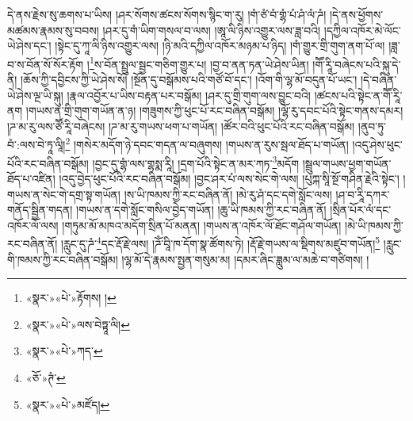 དེ་ནས་རྗེས་སུ་ཆགས་པ་ཡིས། །ཤར་སོགས་ཚངས་སོགས་སྙིང་ག་རུ། །གཾ་ཙཾ་བཾ་གྷཾ་པཾ་ཤཾ་ལཾ་ཌཾ། །དེ་ནས་ཕྱོགས་མཚམས་རྣམས་སུ་བབས། །ཤར་དུ་གཾ་ཡིག་གསལ་བ་ལས། །ཨཱ་ལི་ཉིས་འགྱུར་ལས་ཟླ་བའི། །དཀྱིལ་འཁོར་མེ་ལོང་ཡེ་ཤེས་དང་། །སྟེང་དུ་ཀཱ་ལི་ཉིས་འགྱུར་ལས། །ཉི་མའི་དཀྱིལ་འཁོར་མཉམ་པ་ཉིད། །གཾ་གྱུར་གྲི་གུག་ནག་པོ་ལ། །ཟླ་བ་ས་བོན་སོ་སོར་རྟོག །\footnote{«སྣར་»«པེ་»རྟོགས། །}ས་བོན་སྤྲུལ་སྦྱང་གཅིག་གྱུར་པ། །བྱ་བ་ནན་ཏན་ཡེ་ཤེས་ཡིན། །གཽ་རཱི་བཞེངས་པའི་སྐུ་དེ་ནི། །ཆོས་ཀྱི་དབྱིངས་ཀྱི་ཡེ་ཤེས་སོ། །སྔོན་དུ་བསྒོམས་པའི་གཙོ་བོ་དང་། །འོག་གི་ལྷ་མོ་བདུན་པོ་ཡང་། །དེ་བཞིན་ཡེ་ཤེས་ལྔ་ཡི་སྐུ། །རྣལ་འབྱོར་པ་ཡིས་བརྟན་པར་བསྒོམ། །ཤར་དུ་གྲི་གུག་ལས་བྱུང་བའི། །ཚངས་པའི་སྟེང་ན་གཽ་རཱི་ནག །གཡས་ན་གྲི་གུག་གཡོན་ན་ཉ། །གཟུགས་ཀྱི་ཕུང་པོ་རང་བཞིན་བསྒོམ། །ལྷོ་རུ་དབང་པོའི་སྟེང་གནས་དམར། །ཌ་མ་རུ་ལས་ཙཽ་རཱི་བཞེངས། །ཌ་མ་རུ་གཡས་ཕག་པ་གཡོན། །ཚོར་བའི་ཕུང་པོའི་རང་བཞིན་བསྒོམ། །ནུབ་ཏུ་བཾ་:ལས་བེ་ཏཱ་ལཱི།\footnote{«སྣར་»«པེ་»ལས་བེཏྟཱ་ལི།} །གསེར་མདོག་ཉེ་དབང་གདན་ལ་བཞུགས། །གཡས་ན་རུས་སྦལ་ཐོད་པ་གཡོན། །འདུ་ཤེས་ཕུང་པོའི་རང་བཞིན་བསྒོམ། །བྱང་དུ་གྷཾ་ལས་གྷསྨ་རཱི། །དྲག་པོའི་སྟེང་ན་མར་ཀཏ་\footnote{«སྣར་»«པེ་»ཀད་}མདོག །སྦྲུལ་གཡས་ཕྱག་གཡོན་ཐོད་པ་འཛིན། །འདུ་བྱེད་ཕུང་པོའི་རང་བཞིན་བསྒོམ། །བྱང་ཤར་པཾ་ལས་སེང་གེ་ལས། །པུཀྐ་སཱི་སྔོ་གཤིན་རྗེའི་སྟེང་། །གཡས་ན་སེང་གེ་དགྲ་སྟ་གཡོན། །ས་ཡི་ཁམས་ཀྱི་རང་བཞིན་ནོ། །མེ་རུ་ཤཾ་དང་དགེ་སློང་ལས། །ཤ་བ་རཱི་དཀར་གནོད་སྦྱིན་གདན། །གཡས་ན་དགེ་སློང་གསིལ་བྱེད་གཡོན། །ཆུ་ཡི་ཁམས་ཀྱི་རང་བཞིན་ནོ། །སྲིན་པོར་ལཾ་དང་འཁོར་ལོ་ལས། །གཏུམ་མོ་མཁའ་མདོག་སྲིན་པོ་མནན། །གཡས་ན་འཁོར་ལོ་ཐོང་གཤོལ་གཡོན། །མེ་ཡི་ཁམས་ཀྱི་རང་བཞིན་ནོ། །རླུང་དུ་ཌཾ་\footnote{«ཅོ་»ཊཾ་}དང་རྡོ་རྗེ་ལས། །ཌོཾ་བཱི་ཁ་དོག་སྣ་ཚོགས་ཏེ། །རྡོ་རྗེ་གཡས་ལ་སྡིགས་མཛུབ་གཡོན།\footnote{«སྣར་»«པེ་»མཛོད།} །རླུང་གི་ཁམས་ཀྱི་རང་བཞིན་བསྒོམ། །ལྷ་མོ་དེ་རྣམས་སྤྱན་གསུམ་མ། །དམར་ཞིང་ཟླུམ་ལ་མཆེ་བ་གཙིགས། །

